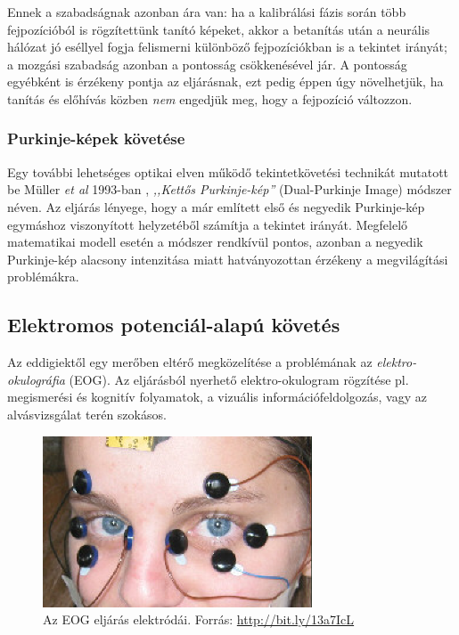 Ennek a szabadságnak azonban ára van: ha a kalibrálási fázis során több fejpozícióból is rögzítettünk tanító képeket, akkor a betanítás után a neurális hálózat jó eséllyel fogja felismerni különböző fejpozíciókban is a tekintet irányát; a mozgási szabadság azonban a pontosság csökkenésével jár. A pontosság egyébként is érzékeny pontja az eljárásnak, ezt pedig éppen úgy növelhetjük, ha tanítás és előhívás közben \emph{nem} engedjük meg, hogy a fejpozíció változzon.

\subsubsection{Purkinje-képek követése}\label{sect:purkinje}

Egy további lehetséges optikai elven működő tekintetkövetési technikát mutatott be Müller \emph{et al} 1993-ban \cite{muller}, \emph{,,Kettős Purkinje-kép''} (Dual-Purkinje Image) módszer néven. Az eljárás lényege, hogy a már említett első és negyedik Purkinje-kép egymáshoz viszonyított helyzetéből számítja a tekintet irányát. Megfelelő matematikai modell esetén a módszer rendkívül pontos, azonban a negyedik Purkinje-kép alacsony intenzitása miatt hatványozottan érzékeny a megvilágítási problémákra.

\subsection{Elektromos potenciál-alapú követés}\label{sect:potencial}

Az eddigiektől egy merőben eltérő megközelítése a problémának az \emph{elektro-okulográfia} (EOG). Az eljárásból nyerhető elektro-okulogram rögzítése pl. megismerési és kognitív folyamatok, a vizuális információfeldolgozás, vagy az alvásvizsgálat terén szokásos.

\begin{figure}[!ht]
\centering
\includegraphics[width=80mm, keepaspectratio]{figures/eog.png}
\caption{Az EOG eljárás elektródái. Forrás: \url{http://bit.ly/13a7IcL}}
\label{fig:eog}
\end{figure}


